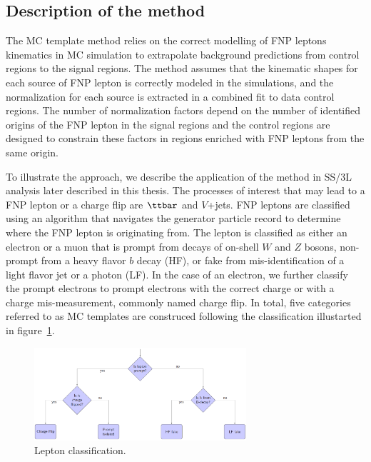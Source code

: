 



\subsection{Description of the method}

The MC template method relies on the correct modelling of FNP leptons kinematics in 
MC simulation to extrapolate background predictions from control regions to the signal regions.
The method assumes that the kinematic shapes for each source of FNP lepton is correctly modeled in the simulations, 
and the normalization for each source is extracted in a combined fit to data control regions.
The number of normalization factors depend on the number of identified origins of the FNP lepton in the signal regions
and the control regions are designed to constrain these factors in regions enriched with FNP leptons from the same origin.

To illustrate the approach, we describe the application of the method in SS/3L analysis later described in this thesis.
The processes of interest that may lead to a FNP lepton or a charge flip are $\ttbar$ and $V$+jets. 
FNP leptons are classified using an algorithm that navigates the generator particle record to determine where the FNP lepton 
is originating from. 
The lepton is classified as either an electron or a muon that is prompt from decays of on-shell $W$ and $Z$ bosons, 
non-prompt from a heavy flavor $b$ decay (HF), or fake from mis-identification of a light flavor jet or a photon (LF). 
In the case of an electron, we further classify the prompt electrons to prompt electrons with the correct charge or with a 
charge mis-measurement, commonly named charge flip.
In total, five categories referred to as MC templates are construced following the classification illustarted 
in figure~\ref{Fig:fakes_classification}.

\begin{figure}[t!]
\centering
\includegraphics[width=0.7\textwidth]{MC-tmpl}
\caption
{Lepton classification.
}
\label{Fig:fakes_classification}
\end{figure}


